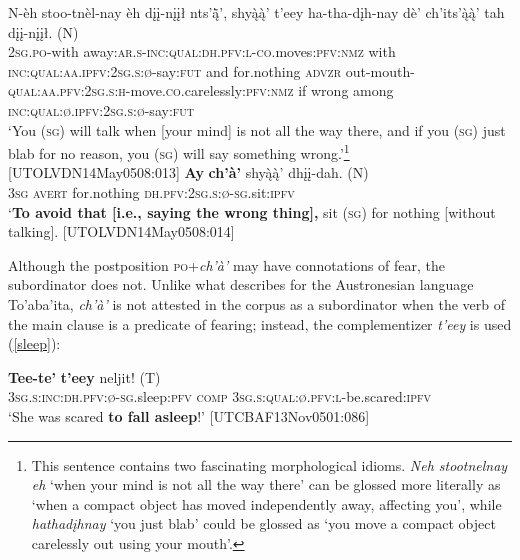 \documentclass[output=paper,colorlinks,citecolor=brown
]{langscibook}
\begin{document}
\begin{exe}
\ex 
\label{avert-pp}
\begin{xlista}
\ex \label{avert-ppa}
\gll N-èh stoo-tnèl-nay èh dįį-nįįł nts'ą̈̀', shyą̀ą̀' t'eey ha-tha-dįh-nay dè' ch'its'ą̀ą̀' tah {dįį-nįįł. \textnormal{(N)}} \\
\textsc{2sg.po}-with away:\textsc{ar.s-inc:qual:dh.pfv:l-co}.moves:\textsc{pfv:nmz} with \textsc{inc:qual:aa.ipfv:2sg.s:ø}-say:\textsc{fut} and for.nothing \textsc{advzr} out-mouth-\textsc{qual:aa.pfv:2sg.s:h}-move.\textsc{co}.carelessly\textsc{:pfv:nmz} if wrong among \textsc{inc:qual:ø.ipfv:2sg.s:ø}-say:\textsc{fut} \\
\glt `You (\textsc{sg}) will talk when [your mind] is not all the way there, and if you (\textsc{sg}) just blab for no reason, you (\textsc{sg}) will say something wrong.'\footnote{This sentence contains two fascinating morphological idioms. \textit{Neh stootnelnay eh} `when your mind is not all the way there' can be glossed more literally as `when a compact object has moved independently away, affecting you', while \textit{hathadįhnay} `you just blab' could be glossed as `you move a compact object carelessly out using your mouth'.} \\ \hfill [UTOLVDN14May0508:013]
\ex\label{avert-ppb}
\gll \textbf{Ay} \textbf{ch'à'} shyą̀ą̀' {dhįį-dah. \textnormal{(N)}} \\
\textsc{3sg} \textsc{avert} for.nothing \textsc{dh.pfv:2sg.s:ø-sg}.sit:\textsc{ipfv} \\
\glt `\textbf{To avoid that [i.e., saying the wrong thing],} sit (\textsc{sg}) for nothing [without talking]. \hfill [UTOLVDN14May0508:014]
\end{xlista}
\end{exe}


Although the postposition \textsc{po}+\textit{ch'à'} may have connotations of fear, the subordinator does not. Unlike what \citet[296–297]{LichtenberkF1995} describes for the Austronesian language To'aba'ita, \textit{ch'à'} is not attested in the corpus as a subordinator when the verb of the main clause is a predicate of fearing; instead, the complementizer \textit{t'eey} is used (\ref{sleep}):

\ea
\label{sleep}
\gll \textbf{Tee-te'} \textbf{t'eey} {neljit! \textnormal{(T)}} \\
\textsc{3sg.s:inc:dh.pfv:ø-sg}.sleep:\textsc{pfv} \textsc{comp} \textsc{3sg.s:qual:ø.pfv:l}-be.scared:\textsc{ipfv} \\
\glt `She was scared \textbf{to fall asleep}!' \hfill [UTCBAF13Nov0501:086]
\z
\end{document}
